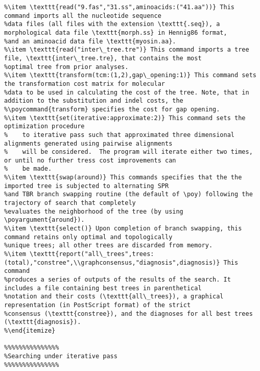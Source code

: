 \begin{verbatim}
%\item \texttt{read("9.fas","31.ss",aminoacids:("41.aa"))} This command imports all the nucleotide sequence 
%data files (all files with the extension \texttt{.seq}), a morphological data file \texttt{morph.ss} in Hennig86 format, 
%and an aminoacid data file \texttt{myosin.aa}.
%\item \texttt{read("inter\_tree.tre")} This command imports a tree file, \texttt{inter\_tree.tre}, that contains the most 
%optimal tree from prior analyses. 
%\item \texttt{transform(tcm:(1,2),gap\_opening:1)} This command sets the transformation cost matrix for molecular 
%data to be used in calculating the cost of the tree. Note, that in addition to the substitution and indel costs, the 
%\poycommand{transform} specifies the cost for gap opening.
%\item \texttt{set(iterative:approximate:2)} This command sets the optimization procedure
%    to iterative pass such that approximated three dimensional alignments generated using pairwise alignments 
%    will be considered.  The program will iterate either two times, or until no further tress cost improvements can 
%    be made.
%\item \texttt{swap(around)} This commands specifies that the the imported tree is subjected to alternating SPR 
%and TBR branch swapping routine (the default of \poy) following the trajectory of search that completely 
%evaluates the neighborhood of the tree (by using \poyargument{around}).
%\item \texttt{select()} Upon completion of branch swapping, this command retains only optimal and topologically 
%unique trees; all other trees are discarded from memory.
%\item \texttt{report("all\_trees",trees:(total),"constree",\\graphconsensus,"diagnosis",diagnosis)} This command 
%produces a series of outputs of the results of the search. It includes a file containing best trees in parenthetical 
%notation and their costs (\texttt{all\_trees}), a graphical representation (in PostScript format) of the strict 
%consensus (\texttt{constree}), and the diagnoses for all best trees (\texttt{diagnosis}).
%\end{itemize}

%%%%%%%%%%%%%%%
%Searching under iterative pass
%%%%%%%%%%%%%%%


\end{verbatim}
